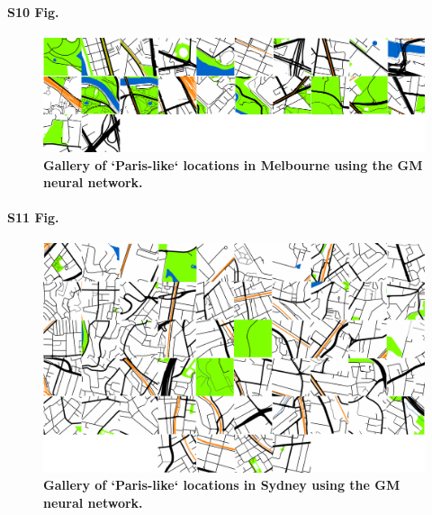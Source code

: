 \documentclass[10pt,letterpaper,hidelinks]{article}
\begin{document}
\paragraph*{S10 Fig.}
\begin{figure}[!htbp]
\centering   
\includegraphics[scale=0.19]{Images/PlosOne/Fig10.png}   
\caption{\bf Gallery of `Paris-like` locations in Melbourne using the GM neural network.}    
 \label{fig:gm_mel_gallery} 
\end{figure} 

\paragraph*{S11 Fig.}
\begin{figure}[!htbp]
\centering   
\includegraphics[scale=0.19]{Images/PlosOne/Fig11.png}   
\caption{\bf Gallery of `Paris-like` locations in Sydney using the GM neural network.}    
 \label{fig:gm_syd_gallery}  
\end{figure} 
\end{document}
